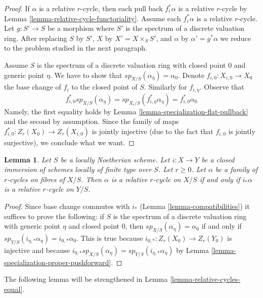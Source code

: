 \documentclass{stacks-project}
\theoremstyle{plain}
\newtheorem{lemma}[subsection]{Lemma}
\theoremstyle{definition}
\theoremstyle{remark}
\numberwithin{equation}{subsection}
\begin{document}
\begin{proof}
If $\alpha$ is a relative $r$-cycle, then each pull back $f_i^*\alpha$ is a
relative $r$-cycle by Lemma \ref{lemma-relative-cycle-functoriality}.
Assume each $f_i^*\alpha$ is a relative $r$-cycle.
Let $g : S' \to S$ be a morphism where $S'$ is the spectrum of a discrete
valuation ring. After replacing $S$ by $S'$, $X$ by $X' = X \times_S S'$, and
$\alpha$ by $\alpha' = g^*\alpha$
we reduce to the problem studied in the next paragraph.

\medskip\noindent
Assume $S$ is the spectrum of a discrete valuation ring with closed
point $0$ and generic point $\eta$. We have to show that
$sp_{X/S}(\alpha_\eta) = \alpha_0$. Denote $f_{i, 0} : X_{i, 0} \to X_0$
the base change of $f_i$ to the closed point of $S$. Similarly
for $f_{i, \eta}$.
Observe that
$$
f_{i, 0}^*sp_{X/S}(\alpha_\eta) =
sp_{X_i/S}(f_{i, \eta}^*\alpha_\eta) = f_{i, 0}^*\alpha_0
$$
Namely, the first equality holds by
Lemma \ref{lemma-specialization-flat-pullback}
and the second by assumption. Since the family of maps
$f_{i, 0}^* : Z_r(X_0) \to Z_r(X_{i, 0})$ is jointly
injective (due to the fact that $f_{i, 0}$ is jointly
surjective), we conclude what we want.
\end{proof}

\begin{lemma}
\label{lemma-check-after-closed}
Let $S$ be a locally Noetherian scheme. Let $i : X \to Y$ be a closed immersion
of schemes locally of finite type over $S$. Let $r \geq 0$.
Let $\alpha$ be a family of $r$-cycles on fibres of $X/S$.
Then $\alpha$ is a relative $r$-cycle on $X/S$ if and only if
$i_*\alpha$ is a relative $r$-cycle on $Y/S$.
\end{lemma}

\begin{proof}
Since base change commutes with $i_*$ (Lemma \ref{lemma-compatibilities})
it suffices to prove the following: if $S$ is the spectrum of a discrete
valuation ring with generic point $\eta$ and closed point $0$,
then $sp_{X/S}(\alpha_\eta) = \alpha_0$ if and only if
$sp_{Y/S}(i_{\eta, *}\alpha_\eta) = i_{0, *}\alpha_0$.
This is true because $i_{0, *} : Z_r(X_0) \to Z_r(Y_0)$
is injective and because $i_{0, *}sp_{X/S}(\alpha_\eta) =
sp_{Y/S}(i_{\eta, *}\alpha_\eta)$ by
Lemma \ref{lemma-specialization-proper-pushforward}.
\end{proof}

\noindent
The following lemma will be strengthened in
Lemma \ref{lemma-relative-cycles-equal}.
\end{document}
